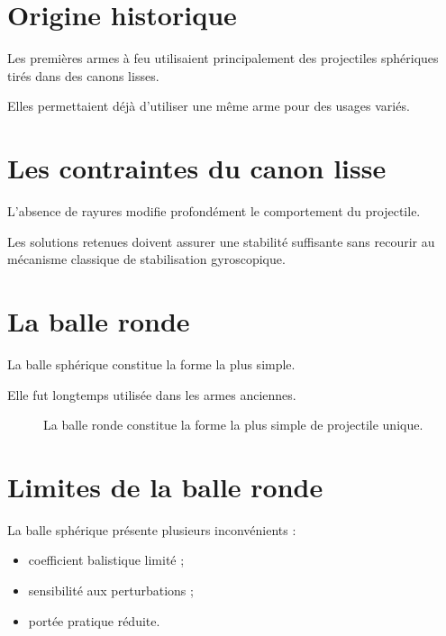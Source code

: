 \section{Origine historique}

Les premières armes à feu utilisaient principalement des projectiles sphériques tirés dans des canons lisses.

Elles permettaient déjà d'utiliser une même arme pour des usages variés.

\section{Les contraintes du canon lisse}

L'absence de rayures modifie profondément le comportement du projectile.

Les solutions retenues doivent assurer une stabilité suffisante sans recourir
au mécanisme classique de stabilisation gyroscopique.

\section{La balle ronde}

La balle sphérique constitue la forme la plus simple.

Elle fut longtemps utilisée dans les armes anciennes.

\begin{figure}[htbp]
\centering


\caption{La balle ronde constitue la forme la plus simple de projectile unique.}
\label{fig:balle_ronde}

\end{figure}

\section{Limites de la balle ronde}

La balle sphérique présente plusieurs inconvénients :

\begin{itemize}
    \item coefficient balistique limité ;
    \item sensibilité aux perturbations ;
    \item portée pratique réduite.
\end{itemize}

